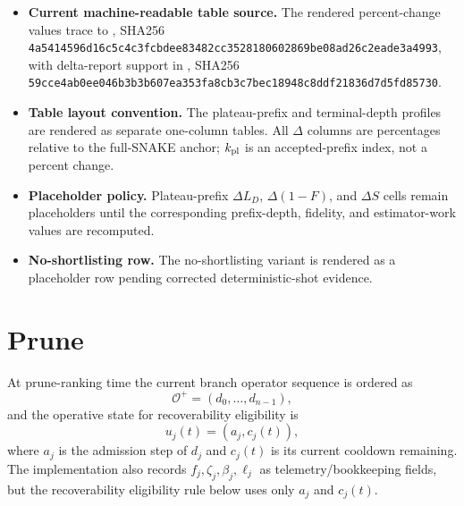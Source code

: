 \documentclass[
  reprint,
  amsmath,
  amssymb,
  aps,
  pra,
  nofootinbib,
  superscriptaddress,
  floatfix
]{revtex4-2}
\begin{document}
\begin{itemize}
\item \textbf{Current machine-readable table source.} The rendered percent-change values trace to , SHA256 \texttt{4a5414596d16c5c4c3fcbdee83482cc3528180602869be08ad26c2eade3a4993}, with delta-report support in , SHA256 \texttt{59cce4ab0ee046b3b3b607ea353fa8cb3c7bec18948c8ddf21836d7d5fd85730}.
\item \textbf{Table layout convention.} The plateau-prefix and terminal-depth profiles are rendered as separate one-column tables. All \(\Delta\) columns are percentages relative to the full-SNAKE anchor; \(k_{\rm pl}\) is an accepted-prefix index, not a percent change.
\item \textbf{Placeholder policy.} Plateau-prefix \(\Delta L_D\), \(\Delta(1-F)\), and \(\Delta S\) cells remain placeholders until the corresponding prefix-depth, fidelity, and estimator-work values are recomputed.
\item \textbf{No-shortlisting row.} The no-shortlisting variant is rendered as a placeholder row pending corrected deterministic-shot evidence.
\end{itemize}

\fi

\section{Prune}
\label{app:prune}

At prune-ranking time the current branch operator sequence is ordered as
\[
\mathcal O^{+}=(d_0,\ldots,d_{n-1}),
\]
and the operative state for recoverability eligibility is
\[
u_j(t)=(a_j,c_j(t)),
\]
where \(a_j\) is the admission step of \(d_j\) and \(c_j(t)\) is its current cooldown remaining.  The implementation also records \(f_j,\zeta_j,\beta_j,\ell_j\) as telemetry/bookkeeping fields, but the recoverability eligibility rule below uses only \(a_j\) and \(c_j(t)\).
\end{document}
